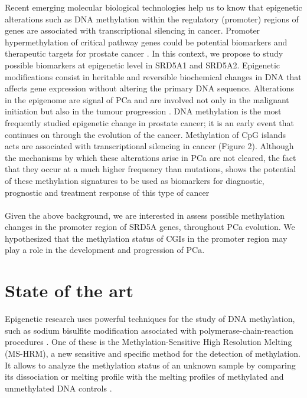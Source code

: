 \documentclass[a4paper,11pt]{article}
\begin{document}
Recent emerging molecular biological technologies help us to know that epigenetic alterations such as DNA methylation within the regulatory (promoter) regions of genes are associated with transcriptional silencing in cancer. Promoter hypermethylation of critical pathway genes could be potential biomarkers and therapeutic targets for prostate cancer \cite{Yang2012}.
In this context, we propose to study possible biomarkers at epigenetic level in SRD5A1 and SRD5A2. Epigenetic modifications consist in heritable and reversible biochemical changes in DNA that affects gene expression without altering the primary DNA sequence. Alterations in the epigenome are signal of PCa and are involved not only in the malignant initiation but also in the tumour progression \cite{Goering2012}. DNA methylation is the most frequently studied epigenetic change in prostate cancer; it is an early event that continues on through the evolution of the cancer. Methylation of CpG islands acts are associated with transcriptional silencing in cancer (Figure 2). Although the mechanisms by which these alterations arise in PCa are not cleared, the fact that they occur at a much higher frequency than mutations, shows the potential of these methylation signatures to be used as biomarkers for diagnostic, prognostic and treatment response of this type of cancer \cite{Strand2014, Yang2012}  \\ \\ Given the above background, we are interested in assess possible methylation changes in the promoter region of SRD5A genes, throughout PCa evolution. We hypothesized that the methylation status of CGIs in the promoter region may play a role in the development and progression of PCa. 
\section{State of the art}
Epigenetic research uses powerful techniques for the study of DNA methylation, such as sodium bisulfite modification associated with polymerase-chain-reaction procedures \cite{Jeronimo2011}. One of these is the Methylation-Sensitive High Resolution Melting (MS-HRM), a new sensitive and specific method for the detection of methylation. It allows to analyze the methylation status of an unknown sample by comparing its dissociation or melting profile with the melting profiles of methylated and unmethylated DNA controls \cite{Wojdacz2007, Wojdacz2010}. 
\end{document}

